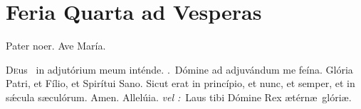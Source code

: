 \documentclass[12pt]{article} %
\newenvironment{response}{\leftskip 0in \setlength{\parindent}{0in}}{\vspace{2 mm}}
\def\vel{\textit{\textcolor{benred8}{vel :}}}
\let\oldRbar\Rbar
\renewcommand{\Rbar}{\textcolor{benred8}{\oldRbar .}}
\let\oldAbar\Abar
\renewcommand{\Abar}{\textcolor{benred8}{\oldAbar .}}
\let\oldgrealtcross\grealtcross
\renewcommand{\grealtcross}{\textcolor{benred8}{\oldgrealtcross}}
\begin{document}

\newpage


\section*{Feria Quarta ad Vesperas}

\begin{center}Pater noer. Ave Mar\'{i}a.\end{center}

\thispagestyle{plain}

\begin{response}\lettrine{D}{e}us \grealtcross\ in adjut\'{o}rium meum int\'{e}nde. \Rbar\ D\'{o}mine ad adjuv\'{a}ndum me fe\'{i}na. Gl\'{o}ria Patri, et F\'{i}lio, et Spir\'{i}tui Sano. Sicut erat in princ\'{i}pio, et nunc, et semper, et in s\'{\ae}cula s\ae cul\'{o}rum. Amen. Allel\'{u}ia. \vel\ Laus tibi D\'{o}mine Rex \ae t\'{e}rn\ae\ gl\'{o}ri\ae .

\end{response}


\subsection*{}



\def\greinitialformat#1{%
{\fontsize{60}{60}\selectfont #1}%
}

\gresetfirstlineaboveinitial{\small \textsc{ \textbf{\textcolor{benred8}{1 \Abar\ II D}}}}{}%

\def\greinitialformat#1{%
{\fontsize{43}{43}\selectfont #1}%
}
\end{document}
